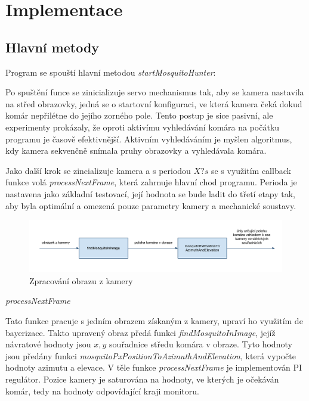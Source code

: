 \documentclass[a4paper,10pt]{article}
\begin{document}
\section{Implementace}

\subsection{Hlavní metody}

Program se spouští hlavní metodou \textit{startMosquitoHunter}:

Po spuštění funce se zinicializuje servo mechanismus tak, aby se kamera nastavila na střed obrazovky, jedná se o startovní konfiguraci, ve která kamera čeká dokud komár nepřilétne do jejího zorného pole. Tento postup je sice pasivní, ale experimenty prokázaly, že oproti aktivímu vyhledávání komára na počátku programu je časově efektivnější. Aktivním vyhledáváním je myšlen algoritmus, kdy kamera sekvenčně snímala pruhy obrazovky a vyhledávala komára.

Jako další krok se zincializuje kamera a s periodou $X? s$ se s využitím callback funkce volá \textit{processNextFrame}, která zahrnuje hlavní chod programu. Perioda je nastavena jako základní testovací, její hodnota se bude ladit do třetí etapy tak, aby byla optimální a omezená pouze parametry kamery a mechanické soustavy. 

\begin{figure}[!h]
    \centering
     \includegraphics[width=1\columnwidth]{pics/zpracovani_obrazu_z_kamery}
     \caption{Zpracování obrazu z kamery\label{fig:rid_system}}
\end{figure}


\vspace{0.5cm}
\textit{processNextFrame}

Tato funkce pracuje s jedním obrazem získaným z kamery, upraví ho využitím de bayerizace. Takto upravený obraz předá funkci \textit{findMosquitoInImage}, jejíž návratové hodnoty jsou $x, y$ souřadnice středu komára v obraze. Tyto hodnoty jsou předány funkci \textit{mosquitoPxPositionToAzimuthAndElevation}, která vypočte hodnoty azimutu a elevace. V těle funkce \textit{processNextFrame} je implementován PI regulátor. Pozice kamery je saturována na hodnoty, ve kterých je očekáván komár, tedy na hodnoty odpovídající kraji monitoru. 
\end{document}
